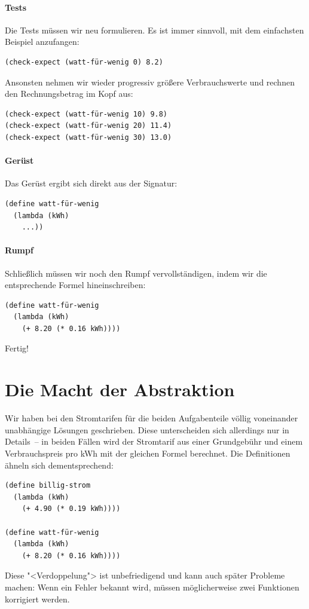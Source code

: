 \paragraph{Tests}

Die Tests müssen wir neu formulieren.  Es ist immer sinnvoll, mit dem
einfachsten Beispiel anzufangen:
\begin{lstlisting}
(check-expect (watt-für-wenig 0) 8.2)
\end{lstlisting}

Ansonsten nehmen wir wieder progressiv größere Verbrauchswerte und
rechnen den Rechnungsbetrag im Kopf aus:
%
\begin{lstlisting}
(check-expect (watt-für-wenig 10) 9.8)
(check-expect (watt-für-wenig 20) 11.4)
(check-expect (watt-für-wenig 30) 13.0)
\end{lstlisting}

\paragraph{Gerüst}

Das Gerüst ergibt sich direkt aus der Signatur:
%
\begin{lstlisting}
(define watt-für-wenig
  (lambda (kWh)
    ...))
\end{lstlisting}

\paragraph{Rumpf}

Schließlich müssen wir noch den Rumpf vervollständigen, indem wir die
entsprechende Formel hineinschreiben:
%
\begin{lstlisting}
(define watt-für-wenig
  (lambda (kWh)
    (+ 8.20 (* 0.16 kWh))))
\end{lstlisting}
%
Fertig!

\section{Die Macht der Abstraktion}
\label{sec:abstraktion}

Wir haben bei den Stromtarifen für die beiden
Aufgabenteile völlig voneinander unabhängige Lösungen geschrieben.
Diese unterscheiden sich allerdings nur in Details~-- in beiden Fällen
wird der Stromtarif aus einer Grundgebühr und einem Verbrauchspreis
pro kWh mit der gleichen Formel berechnet.  Die Definitionen ähneln
sich dementsprechend:
%
\begin{lstlisting}
(define billig-strom
  (lambda (kWh)
    (+ 4.90 (* 0.19 kWh))))

(define watt-für-wenig
  (lambda (kWh)
    (+ 8.20 (* 0.16 kWh))))
\end{lstlisting}
%
Diese "<Verdoppelung"> ist unbefriedigend und kann auch später
Probleme machen: Wenn ein Fehler bekannt wird, müssen möglicherweise
zwei Funktionen korrigiert werden.

